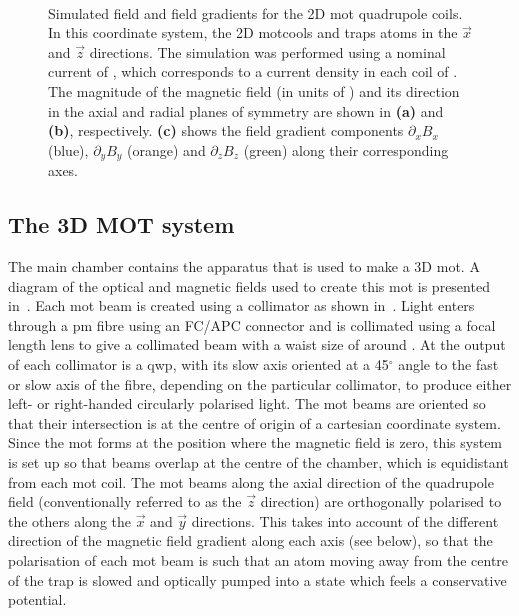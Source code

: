 \begin{figure}
    \centering
    \def\svgwidth{\columnwidth}
    \\
    \caption[Simulated field and field gradients for the 2D \ac{mot} quadrupole coils]{Simulated field and field gradients for the 2D \ac{mot} quadrupole coils. In this coordinate system, the 2D \ac{mot}cools and traps atoms in the \(\vec{x}\) and  \(\vec{z}\) directions. The simulation was performed using a nominal current of , which corresponds to a current density in each coil of . The magnitude of the magnetic field (in units of \sivalue{}{\gauss}) and its direction in the axial and radial planes of symmetry are shown in \textbf{(a)} and \textbf{(b)}, respectively. \textbf{(c)} shows the field gradient components \(\partial_x B_x\) (blue), \(\partial_y B_y\) (orange) and \(\partial_z B_z\) (green) along their corresponding axes.}
    \label{fig:2d_mot_field_gradient}
\end{figure}
\subsection{The 3D MOT system}\label{sec:3d_mot}
The main chamber contains the apparatus that is used to make a 3D \ac{mot}. A diagram of the optical and magnetic fields used to create this \ac{mot} is presented in~. Each \ac{mot} beam is created using a collimator as shown in~. Light enters through a \ac{pm} fibre using an FC/APC connector and is collimated using a  focal length lens to give a collimated beam with a waist size of around . At the output of each collimator is a \ac{qwp}, with its slow axis oriented at a 45\(^\circ\) angle to the fast or slow axis of the fibre, depending on the particular collimator, to produce either left- or right-handed circularly polarised light. The \ac{mot} beams are oriented so that their intersection is at the centre of origin of a cartesian coordinate system. Since the \ac{mot} forms at the position where the magnetic field is zero, this system is set up so that beams overlap at the centre of the chamber, which is equidistant from each \ac{mot} coil. The \ac{mot} beams along the axial direction of the quadrupole field (conventionally referred to as the \(\vec{z}\) direction) are orthogonally polarised to the others along the \(\vec{x}\) and \(\vec{y}\) directions. This takes into account of the different direction of the magnetic field gradient along each axis (see below), so that the polarisation of each \ac{mot} beam is such that an atom moving away from the centre of the trap is slowed and optically pumped into a state which feels a conservative potential.
